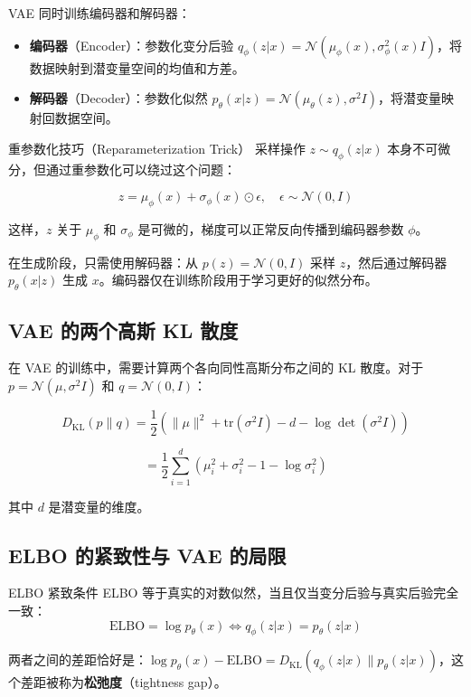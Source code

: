 \documentclass[a4paper]{article}
\begin{document}
VAE 同时训练编码器和解码器：

\begin{itemize}
    \item \textbf{编码器}（Encoder）：参数化变分后验 $q_\phi(z|x) = \mathcal{N}(\mu_\phi(x), \sigma^2_\phi(x) I)$，将数据映射到潜变量空间的均值和方差。
    \item \textbf{解码器}（Decoder）：参数化似然 $p_\theta(x|z) = \mathcal{N}(\mu_\theta(z), \sigma^2 I)$，将潜变量映射回数据空间。
\end{itemize}

\begin{knowledgebox}{重参数化技巧（Reparameterization Trick）}
采样操作 $z \sim q_\phi(z|x)$ 本身不可微分，但通过重参数化可以绕过这个问题：

$$z = \mu_\phi(x) + \sigma_\phi(x) \odot \epsilon, \quad \epsilon \sim \mathcal{N}(0, I)$$

这样，$z$ 关于 $\mu_\phi$ 和 $\sigma_\phi$ 是可微的，梯度可以正常反向传播到编码器参数 $\phi$。
\end{knowledgebox}

在生成阶段，只需使用解码器：从 $p(z) = \mathcal{N}(0, I)$ 采样 $z$，然后通过解码器 $p_\theta(x|z)$ 生成 $x$。编码器仅在训练阶段用于学习更好的似然分布。

\subsection{VAE 的两个高斯 KL 散度}

在 VAE 的训练中，需要计算两个各向同性高斯分布之间的 KL 散度。对于 $p = \mathcal{N}(\mu, \sigma^2 I)$ 和 $q = \mathcal{N}(0, I)$：

$$D_{\text{KL}}(p \| q) = \frac{1}{2} \left( \|\mu\|^2 + \text{tr}(\sigma^2 I) - d - \log \det(\sigma^2 I) \right)$$

$$= \frac{1}{2} \sum_{i=1}^{d} \left( \mu_i^2 + \sigma_i^2 - 1 - \log \sigma_i^2 \right)$$

其中 $d$ 是潜变量的维度。

\subsection{ELBO 的紧致性与 VAE 的局限}

\begin{importantbox}{ELBO 紧致条件}
ELBO 等于真实的对数似然，当且仅当变分后验与真实后验完全一致：
$$\text{ELBO} = \log p_\theta(x) \iff q_\phi(z|x) = p_\theta(z|x)$$

两者之间的差距恰好是：$\log p_\theta(x) - \text{ELBO} = D_{\text{KL}}(q_\phi(z|x) \| p_\theta(z|x))$，这个差距被称为\textbf{松弛度}（tightness gap）。
\end{importantbox}
\end{document}
